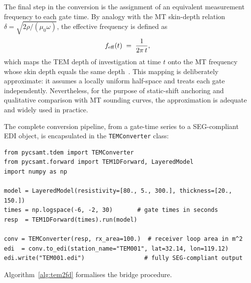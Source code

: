 \documentclass[review,12pt]{elsarticle}
\begin{document}
The final step in the conversion is the assignment of an equivalent
measurement frequency to each gate time.
By analogy with the MT skin-depth relation $\delta = \sqrt{2\rho/(\mu_0\omega)}$,
the effective frequency is defined as
\begin{equation}
  f_{\rm eff}(t) \;=\; \frac{1}{2\pi\,t},
  \label{eq:feff}
\end{equation}
which maps the TEM depth of investigation at time $t$ onto the MT frequency
whose skin depth equals the same depth~\citep{Christiansen2009}.
This mapping is deliberately approximate: it assumes a locally uniform
half-space and treats each gate independently.
Nevertheless, for the purpose of static-shift anchoring and qualitative
comparison with MT sounding curves, the approximation is adequate and
widely used in practice.

The complete conversion pipeline, from a gate-time series to a
SEG-compliant EDI object, is encapsulated in the \texttt{TEMConverter}
class:

\begin{lstlisting}[style=pycode, caption={TEM-to-frequency-domain conversion and EDI export.}]
from pycsamt.tdem import TEMConverter
from pycsamt.forward import TEM1DForward, LayeredModel
import numpy as np

model = LayeredModel(resistivity=[80., 5., 300.], thickness=[20., 150.])
times = np.logspace(-6, -2, 30)       # gate times in seconds
resp  = TEM1DForward(times).run(model)

conv = TEMConverter(resp, rx_area=100.)  # receiver loop area in m^2
edi  = conv.to_edi(station_name="TEM001", lat=32.14, lon=119.12)
edi.write("TEM001.edi")                 # fully SEG-compliant output
\end{lstlisting}

Algorithm~\ref{alg:tem2fd} formalises the bridge procedure.
\end{document}
